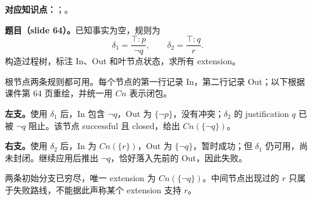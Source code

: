 
\textbf{对应知识点：}；。

\textbf{题目（slide 64）。}已知事实为空，规则为
\[
 \delta_1=\frac{\top:p}{\neg q},\qquad
 \delta_2=\frac{\top:q}{r}.
\]
构造过程树，标注 In、Out 和叶节点状态，求所有 extension。

\begin{workedsolution}
根节点两条规则都可用。每个节点的第一行记录 In，第二行记录 Out；以下根据课件第 64 页重绘，并统一用 $Cn$ 表示闭包。

\begin{center}

\end{center}

\textbf{左支。}使用 $\delta_1$ 后，In 包含 $\neg q$，Out 为 $\{\neg p\}$，没有冲突；$\delta_2$ 的 justification $q$ 已被 $\neg q$ 阻止。该节点 successful 且 closed，给出 $Cn(\{\neg q\})$。

\textbf{右支。}使用 $\delta_2$ 后，In 为 $Cn(\{r\})$，Out 为 $\{\neg q\}$，暂时成功；但 $\delta_1$ 仍可用，尚未封闭。继续应用后推出 $\neg q$，恰好落入先前的 Out，因此失败。

两条初始分支已穷尽，唯一 extension 为 $\boxed{Cn(\{\neg q\})}$。中间节点出现过的 $r$ 只属于失败路线，不能据此声称某个 extension 支持 $r$。
\end{workedsolution}
\endgroup
